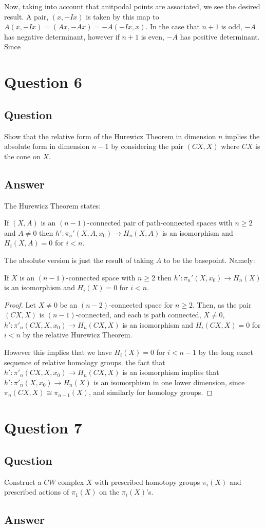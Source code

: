 \documentclass[11pt]{article}
\begin{document}
Now, taking into account that anitpodal points are associated, we see the desired result. A pair, $(x, -Ix)$ is taken by this map to $A(x,-Ix) = (Ax, -Ax)=-A(-Ix, x)$. 
In the case that $n+1$ is odd, $-A$ has negative determinant, however if $n+1$ is even, $-A$ has positive determinant. Since 

\section{Question 6}
\subsection{Question}
Show that the relative form of the Hurewicz Theorem in dimension $n$ implies the absolute form in dimension $n-1$ by considering the pair $(CX,X)$ where $CX$ is the cone on $X$.
\subsection{Answer}
The Hurewicz Theorem states:

If $(X, A)$ is an $(n-1)$-connected pair of path-connected spaces with $n\geq2$ and $A\neq 0$ then $h':\pi_n'(X,A,x_0) \to H_n(X,A)$ is an isomorphism and $H_i(X,A) =0$ for $i<n$.

The absolute version is just the result of taking $A$ to be the basepoint. Namely:

If $X$ is an $(n-1)$-connected space with $n\geq2$ then $h':\pi_n'(X,x_0) \to H_n(X)$ is an isomorphism and $H_i(X) =0$ for $i<n$.

\begin{proof}
Let $X \neq 0$ be an $(n-2)$-connected space for $n \geq 2$. Then, as the pair $(CX, X)$ is $(n-1)$-connected, and each is path connected, $X\neq 0$, $h':\pi'_n(CX,X,x_0) \to H_n(CX,X)$ is an isomorphism and $H_i(CX,X)=0$ for $i<n$ by the relative Hurewicz Theorem.

However this implies that  we have $H_i(X)=0$ for $i< n-1$ by the long exact sequence of relative homology groups. the fact that $h':\pi'_n(CX,X,x_0) \to H_n(CX,X)$ is an isomorphism implies that $h':\pi'_n(X,x_0) \to H_n(X)$ is an isomorphism in one lower dimension, since $\pi_n(CX,X) \cong \pi_{n-1}(X)$, and similarly for homology groups.
\end{proof}

\section{Question 7}
\subsection{Question}
Construct a $CW$ complex $X$ with prescribed homotopy groups $\pi_i(X)$ and prescribed actions of $\pi_1(X)$ on the $\pi_i(X)$'s.
\subsection{Answer}
\end{document}
